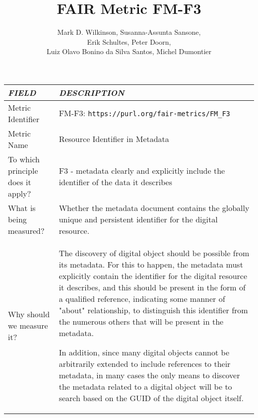 \documentclass[english]{article}
\begin{document}
\title{FAIR Metric FM-F3}

\author{Mark D. Wilkinson, Susanna-Assunta Sansone, \\Erik Schultes, Peter Doorn,\\ 
Luiz Olavo Bonino da Silva Santos, Michel Dumontier}

\maketitle

\newpage





\begin{longtable}{|p{5cm}|p{9cm}|}


\hline
\emph{FIELD} & \emph{DESCRIPTION} \\
\hline
Metric Identifier &   FM-F3: \verb"https://purl.org/fair-metrics/FM_F3"
 \\


\hline
Metric Name &   

Resource Identifier in Metadata


 \\



\hline
To which principle does it apply? &   
F3 - metadata clearly and explicitly include the identifier of the data it describes
\\



\hline
What is being measured? & 


Whether the metadata document contains the globally unique and persistent identifier for the digital resource.

\\



\hline
Why should we measure it? & 



The discovery of digital object should be possible from its metadata. For this to happen, the metadata must explicitly contain the identifier for the digital resource it describes, and this should be present in the form of a qualified reference, indicating some manner of "about" relationship, to distinguish this identifier from the numerous others that will be present in the metadata.

In addition, since many digital objects cannot be arbitrarily extended to include references to their metadata, in many cases the only means to discover the metadata related to a digital object will be to search based on the GUID of the digital object itself.


\end{longtable}
\end{document}

